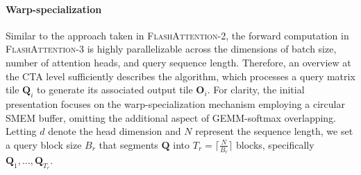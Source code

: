 \paragraph{Warp-specialization}
Similar to the approach taken in \textsc{FlashAttention-2}, the forward computation in \textsc{FlashAttention-3} is highly parallelizable across the dimensions of batch size, number of attention heads, and query sequence length. Therefore, an overview at the CTA level sufficiently describes the algorithm, which processes a query matrix tile $\mathbf{Q}_i$ to generate its associated output tile $\mathbf{O}_i$. For clarity, the initial presentation focuses on the warp-specialization mechanism employing a circular SMEM buffer, omitting the additional aspect of GEMM-softmax overlapping. Letting $d$ denote the head dimension and $N$ represent the sequence length, we set a query block size $B_r$ that segments $\mathbf{Q}$ into $T_r = \lceil \frac{N}{B_r} \rceil$ blocks, specifically $\mathbf{Q}_1, \dots, \mathbf{Q}_{T_r}$.

